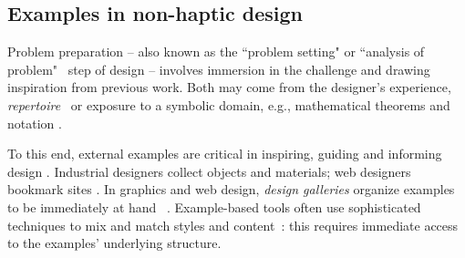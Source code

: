 


\subsection{Examples in non-haptic design}

Problem preparation -- also known as the ``problem setting" \cite{Schon1982} or ``analysis of problem"~\cite{Warr2005}
step of design -- involves 
immersion in the challenge
and drawing inspiration from previous work. %
Both may come from the designer's experience,  \emph{repertoire}~\cite{Schon1982} or exposure to a symbolic domain, e.g., mathematical theorems and notation %
\cite{Csikszentmihalyi1996}.

To this end, external examples are critical in inspiring, guiding and informing design \cite{Herring2009,Buxton2007}. 
Industrial designers collect objects %
and materials; web designers bookmark sites \cite{Herring2009}.
In graphics and web design, \emph{design galleries} organize examples to be  immediately at hand %
~\cite{Lee2010a,Marks1997}.
Example-based tools often use sophisticated techniques to mix and match styles and content~\cite{Kumar2011}: this requires immediate access to the examples' underlying structure.


